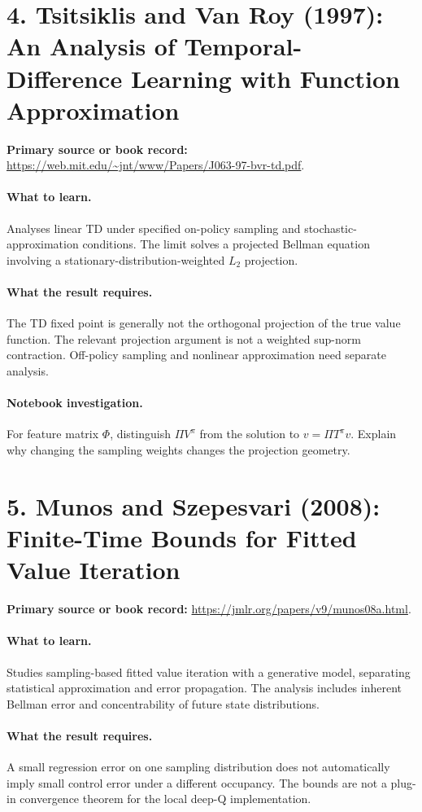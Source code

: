 \documentclass[11pt]{scrartcl}
\begin{document}
\section*{4. Tsitsiklis and Van Roy (1997): An Analysis of Temporal-Difference Learning with Function Approximation}
\textbf{Primary source or book record:} \url{https://web.mit.edu/~jnt/www/Papers/J063-97-bvr-td.pdf}.

\paragraph{What to learn.} Analyses linear TD under specified on-policy sampling and stochastic-approximation conditions. The limit solves a projected Bellman equation involving a stationary-distribution-weighted $L_2$ projection.

\paragraph{What the result requires.} The TD fixed point is generally not the orthogonal projection of the true value function. The relevant projection argument is not a weighted sup-norm contraction. Off-policy sampling and nonlinear approximation need separate analysis.

\paragraph{Notebook investigation.} For feature matrix $\Phi$, distinguish $\Pi V^\pi$ from the solution to $v=\Pi T^\pi v$. Explain why changing the sampling weights changes the projection geometry.

\section*{5. Munos and Szepesvari (2008): Finite-Time Bounds for Fitted Value Iteration}
\textbf{Primary source or book record:} \url{https://jmlr.org/papers/v9/munos08a.html}.

\paragraph{What to learn.} Studies sampling-based fitted value iteration with a generative model, separating statistical approximation and error propagation. The analysis includes inherent Bellman error and concentrability of future state distributions.

\paragraph{What the result requires.} A small regression error on one sampling distribution does not automatically imply small control error under a different occupancy. The bounds are not a plug-in convergence theorem for the local deep-Q implementation.
\end{document}
